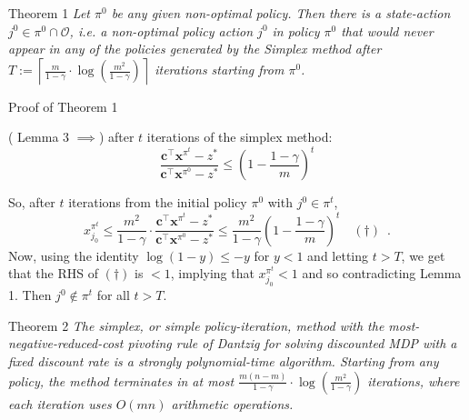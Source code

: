 \documentclass{beamer}
\renewcommand{\vec}[1]{\mathbf{#1}}
\begin{document}

\begin{frame}{Theorem 1}
\emph{
Let $\pi^0$ be any given non-optimal policy. 
Then there is a state-action $j^0\in\pi^0\cap\mathcal{O}$, i.e. a non-optimal policy action $j^0$ in policy $\pi^0$ that would never appear in any of the policies generated by the Simplex method after $T:=\left\lceil\frac{m}{1-\gamma}\cdot\log\left(\frac{m^2}{1-\gamma}\right)\right\rceil$ iterations starting from $\pi^0$.
}
\end{frame}


\begin{frame}{Proof of Theorem 1}

( Lemma 3 $\implies$) after $t$ iterations of the simplex method:
$$\frac{\vec{c}^\top\vec{x}^{\pi^t}-z^*}{\vec{c}^\top\vec{x}^{\pi^0}-z^*}
\leq\left(1-\frac{1-\gamma}{m}\right)^t$$

So, after $t$ iterations from the initial policy $\pi^0$ with $j^0\in\pi^t$, 
$$
x_{j_0}^{\pi^t}
\leq\frac{m^2}{1-\gamma}\cdot\frac{\vec{c}^\top\vec{x}^{\pi^t}-z^*}{\vec{c}^\top\vec{x}^{\pi^0}-z^*}
\leq\frac{m^2}{1-\gamma}\left(1-\frac{1-\gamma}{m}\right)^t
\quad(\dagger)
\enspace.
$$
Now, using the identity $\log(1-y)\leq-y$ for $y<1$ and letting $t>T$, we get that the RHS of $(\dagger)$ is $<1$, implying that $
x_{j_0}^{\pi^t}<1$ and so contradicting Lemma 1. Then $j^0\notin\pi^t$ for all $t>T$.

\end{frame}


\begin{frame}{Theorem 2}
\emph{
The simplex, or simple policy-iteration, method with the most-negative-reduced-cost pivoting rule of Dantzig for solving discounted  MDP with a fixed discount rate is a strongly polynomial-time algorithm. 
Starting from any policy, the method terminates in at most $\frac{m(n-m)}{1-\gamma}\cdot\log\left(\!\frac{m^2}{1-\gamma} \right)$ iterations, where each iteration uses $O(mn)$ arithmetic operations.
}
\end{frame}

\end{document}
